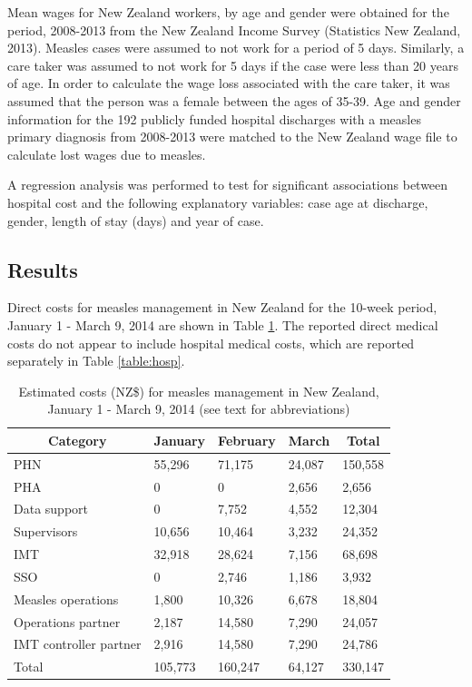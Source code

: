 \documentclass{article}
\begin{document}
Mean wages for New Zealand workers, by age and gender were obtained for the period, 2008-2013 from the New Zealand Income Survey (Statistics New Zealand, 2013). Measles cases were assumed to not work for a period of 5 days. Similarly, a care taker was assumed to not work for 5 days if the case were less than 20 years of age. In order to calculate the wage loss associated with the care taker, it was assumed that the person was a female between the ages of 35-39. Age and gender information for the 192 publicly funded hospital discharges with a measles primary diagnosis from 2008-2013 were matched to the New Zealand wage file to calculate lost wages due to measles.

A regression analysis was performed to test for significant associations between hospital cost and the following explanatory variables: case age at discharge, gender, length of stay (days) and year of case.

\subsection{Results}
Direct costs for measles management in New Zealand for the 10-week period, January 1 - March 9, 2014 are shown in  Table \ref{table:direct}. The reported direct medical costs do not appear to include hospital medical costs, which are reported separately in Table \ref{table:hosp}. 


\begin{table}
\caption{Estimated costs (NZ\$) for measles management in New Zealand, January 1 - March 9, 2014 (see text for abbreviations)}
\begin{center}
\begin{tabular}{lllll}
\hline\hline
\multicolumn{1}{c}{Category}&\multicolumn{1}{c}{January}&\multicolumn{1}{c}{February}&\multicolumn{1}{c}{March}&\multicolumn{1}{c}{Total}\tabularnewline
\hline
PHN&55,296&71,175&24,087&150,558\tabularnewline
PHA&0&0&2,656&2,656\tabularnewline
Data support&0&7,752&4,552&12,304\tabularnewline
Supervisors&10,656&10,464&3,232&24,352\tabularnewline
IMT&32,918&28,624&7,156&68,698\tabularnewline
SSO&0&2,746&1,186&3,932\tabularnewline
Measles operations&1,800&10,326&6,678&18,804\tabularnewline
Operations partner&2,187&14,580&7,290&24,057\tabularnewline
IMT controller partner&2,916&14,580&7,290&24,786\tabularnewline
Total&105,773&160,247&64,127&330,147\tabularnewline
\hline
\end{tabular}\end{center}\label{table:direct}
\end{table}
\end{document}
